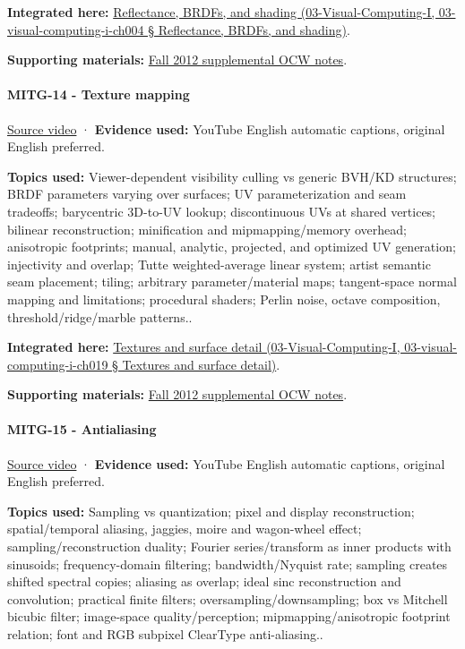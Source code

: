 \textbf{Integrated here:} \href{}{Reflectance, BRDFs, and shading (03-Visual-Computing-I, 03-visual-computing-i-ch004 § Reflectance, BRDFs, and shading)}.

\textbf{Supporting materials:} \href{https://ocw.mit.edu/courses/6-837-computer-graphics-fall-2012/pages/lecture-notes/}{Fall 2012 supplemental OCW notes}.

\paragraph{MITG-14 - Texture mapping}\label{mitg-14---texture-mapping}

\href{https://www.youtube.com/watch?v=TQTciMjuxrY}{Source video} · \textbf{Evidence used:} YouTube English automatic captions, original English preferred.

\textbf{Topics used:} Viewer-dependent visibility culling vs generic BVH/KD structures; BRDF parameters varying over surfaces; UV parameterization and seam tradeoffs; barycentric 3D-to-UV lookup; discontinuous UVs at shared vertices; bilinear reconstruction; minification and mipmapping/memory overhead; anisotropic footprints; manual, analytic, projected, and optimized UV generation; injectivity and overlap; Tutte weighted-average linear system; artist semantic seam placement; tiling; arbitrary parameter/material maps; tangent-space normal mapping and limitations; procedural shaders; Perlin noise, octave composition, threshold/ridge/marble patterns..

\textbf{Integrated here:} \href{}{Textures and surface detail (03-Visual-Computing-I, 03-visual-computing-i-ch019 § Textures and surface detail)}.

\textbf{Supporting materials:} \href{https://ocw.mit.edu/courses/6-837-computer-graphics-fall-2012/pages/lecture-notes/}{Fall 2012 supplemental OCW notes}.

\paragraph{MITG-15 - Antialiasing}\label{mitg-15---antialiasing}

\href{https://www.youtube.com/watch?v=eHXDosme1eo}{Source video} · \textbf{Evidence used:} YouTube English automatic captions, original English preferred.

\textbf{Topics used:} Sampling vs quantization; pixel and display reconstruction; spatial/temporal aliasing, jaggies, moire and wagon-wheel effect; sampling/reconstruction duality; Fourier series/transform as inner products with sinusoids; frequency-domain filtering; bandwidth/Nyquist rate; sampling creates shifted spectral copies; aliasing as overlap; ideal sinc reconstruction and convolution; practical finite filters; oversampling/downsampling; box vs Mitchell bicubic filter; image-space quality/perception; mipmapping/anisotropic footprint relation; font and RGB subpixel ClearType anti-aliasing..

